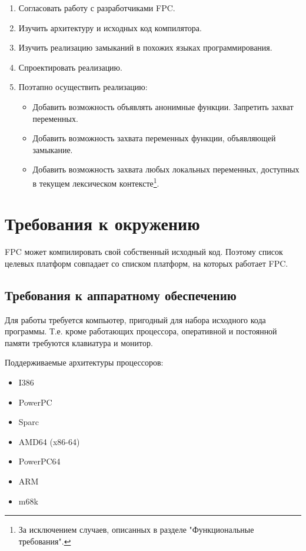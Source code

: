 \documentclass{imcs}
\begin{document}
\begin{enumerate}
    \item Согласовать работу с разработчиками FPC.
    \item Изучить архитектуру и исходных код компилятора.
    \item Изучить реализацию замыканий в похожих языках программирования.
    \item Спроектировать реализацию.
    \item Поэтапно осуществить реализацию:
      \begin{itemize}
          \item Добавить возможность объявлять анонимные функции. Запретить захват переменных.
          \item Добавить возможность захвата переменных функции, объявляющей замыкание.
          \item Добавить возможность захвата любых локальных переменных, 
                доступных в текущем лексическом контексте\footnote{За исключением случаев, описанных в разделе "Функциональные требования".}.
      \end{itemize}        
\end{enumerate}

\section{Требования к окружению}

FPC может компилировать свой собственный исходный код. Поэтому
список целевых платформ совпадает со списком платформ, на которых работает
FPC.

\subsection{Требования к аппаратному обеспечению}

Для работы требуется компьютер, пригодный для набора исходного кода программы.
Т.е. кроме работающих процессора, оперативной и постоянной памяти требуются
клавиатура и монитор.

Поддерживаемые архитектуры процессоров\cite{fpctargets}:
\begin{itemize}
    \item I386
    \item PowerPC
    \item Sparc
    \item AMD64 (x86-64)
    \item PowerPC64
    \item ARM
    \item m68k 
\end{itemize}
\end{document}
